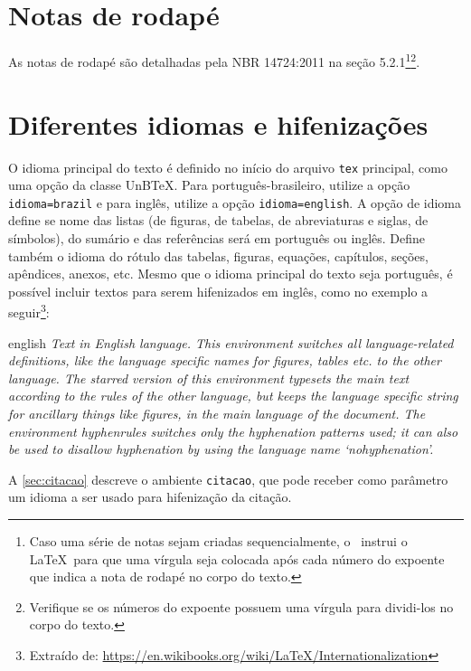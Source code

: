 \section{Notas de rodapé}

As notas de rodapé são detalhadas pela NBR 14724:2011 na seção 5.2.1\footnote{Caso uma série de notas sejam criadas sequencialmente, o \abnTeX\ instrui o \LaTeX\ para que uma vírgula seja colocada após cada número do expoente que indica a nota de rodapé no corpo do texto.}\footnote{Verifique se os números do expoente possuem uma vírgula para dividi-los no corpo do texto.}.

\section{Diferentes idiomas e hifenizações}
\label{sec:hifenizacao}

O idioma principal do texto é definido no início do arquivo \texttt{tex} principal, como uma opção da classe UnB\TeX. Para português-brasileiro, utilize a opção \texttt{idioma=brazil} e para inglês, utilize a opção \texttt{idioma=english}. A opção de idioma define se nome das listas (de figuras, de tabelas, de abreviaturas e siglas, de símbolos), do sumário e das referências será em português ou inglês. Define também o idioma do rótulo das tabelas, figuras, equações, capítulos, seções, apêndices, anexos, etc. Mesmo que o idioma principal do texto seja português, é possível incluir textos para serem hifenizados em inglês, como no exemplo a seguir\footnote{Extraído de: \url{https://en.wikibooks.org/wiki/LaTeX/Internationalization}}:

\begin{otherlanguage*}{english}
\textit{Text in English language. This environment switches all language-related definitions, like the language specific names for figures, tables etc. to the other language. The starred version of this environment typesets the main text according to the rules of the other language, but keeps the language specific string for ancillary things like figures, in the main language of the document. The environment hyphenrules switches only the hyphenation patterns used; it can also be used to disallow hyphenation by using the language name `nohyphenation'.}
\end{otherlanguage*}

A \cref{sec:citacao} descreve o ambiente \texttt{citacao}, que pode receber como parâmetro um idioma a ser usado para hifenização da citação.

